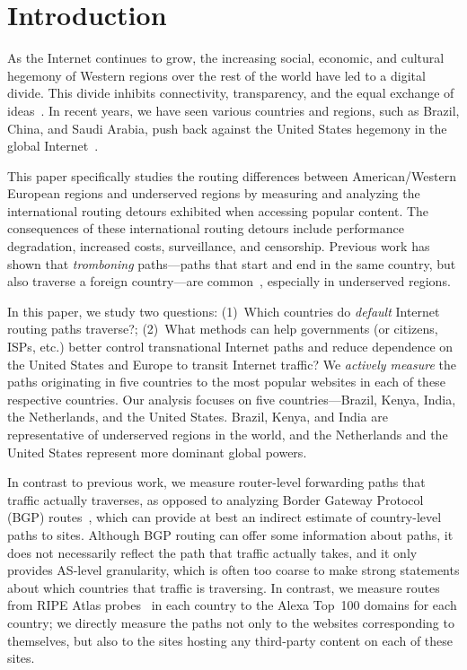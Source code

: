 \section{Introduction}
\label{sec:intro}

As the Internet continues to grow, the increasing social, economic, and cultural 
hegemony of Western regions over the rest of the world have led to a digital divide.  This 
divide inhibits connectivity, transparency, and the equal exchange of ideas~\cite{hegemony}. In 
recent years, we have seen various countries and regions, such as Brazil, China, and Saudi Arabia, push back against the United States hegemony in the global Internet~\cite{hegemony2, hegemony_china,
hegemony_EU}.  

This paper specifically studies the routing differences between American/Western European regions and 
underserved regions by measuring and analyzing the international routing detours exhibited when 
accessing popular content. The consequences of these international routing detours include performance 
degradation, increased costs, surveillance, and censorship.  Previous work has shown that {\it tromboning}
paths---paths that start and end in the same country, but also traverse a
foreign country---are common~\cite{shah2015characterizing,gupta2014peering}, especially in 
underserved regions.  

In this paper, we study two questions: (1)~Which countries do {\em   default}
Internet routing paths traverse?; (2)~What methods can  help governments (or citizens, 
ISPs, etc.) better control transnational Internet paths and reduce dependence on the United States and 
Europe to transit Internet traffic?  We {\em actively
measure} the paths originating in five countries to the most popular
websites in each of these respective countries.
Our analysis focuses on five countries---Brazil,
Kenya, India, the Netherlands, and the United States. Brazil, Kenya, and India are representative of 
underserved regions in the world, and the Netherlands and the United States represent 
more dominant global powers.   

In contrast to previous work, we measure router-level
forwarding paths that traffic actually traverses, as opposed to analyzing Border
Gateway Protocol (BGP)
routes~\cite{karlin2009nation,shah2015characterizing}, which can provide at
best an indirect estimate of country-level paths to sites.
Although BGP routing can offer some information about paths, it does not
necessarily reflect the path that traffic actually takes, and it only provides
AS-level granularity, which is often too coarse to make strong statements
about which countries that traffic is traversing.  In contrast, we measure
routes from RIPE Atlas probes~\cite{ripe_atlas} in each country to the Alexa
Top~100 domains for each country; we directly measure the paths not only to
the websites corresponding to themselves, but also to the sites hosting any
third-party content on each of these sites.

